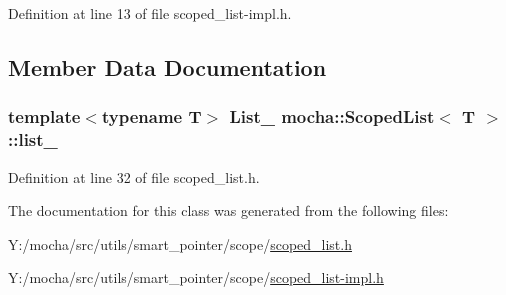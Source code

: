 Definition at line 13 of file scoped\_\-list-\/impl.h.



\subsection{Member Data Documentation}
\hypertarget{classmocha_1_1_scoped_list_a2ba5cdd36f373368d33ba02395cc6542}{
\subsubsection[{list\_\-}]{\setlength{\rightskip}{0pt plus 5cm}template$<$typename T$>$ {\bf List\_\-} {\bf mocha::ScopedList}$<$ T $>$::{\bf list\_\-}}}
\label{classmocha_1_1_scoped_list_a2ba5cdd36f373368d33ba02395cc6542}


Definition at line 32 of file scoped\_\-list.h.



The documentation for this class was generated from the following files:\begin{DoxyCompactItemize}
\item 
Y:/mocha/src/utils/smart\_\-pointer/scope/\hyperlink{scoped__list_8h}{scoped\_\-list.h}\item 
Y:/mocha/src/utils/smart\_\-pointer/scope/\hyperlink{scoped__list-impl_8h}{scoped\_\-list-\/impl.h}\end{DoxyCompactItemize}
